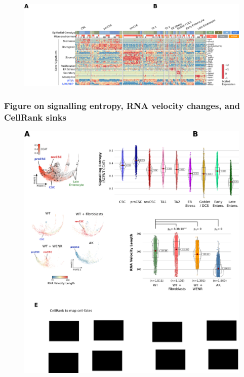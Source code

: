 \begin{figure}
    \centering
    \includegraphics{04seq/figs/4SEQ_DE.png}
    \caption{}
    \label{fig:}
\end{figure}

\subsubsection{Figure on signalling entropy, RNA velocity changes, and CellRank sinks}

\begin{figure}
    \centering
    \includegraphics{04seq/figs/4SEQ_Dynamics.png}
    \caption{}
    \label{fig:}
\end{figure}

